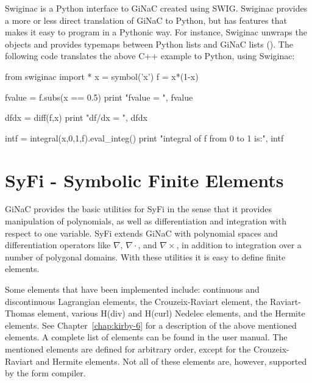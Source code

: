 Swiginac is a Python interface to GiNaC created using SWIG.  
Swiginac provides a more or less direct translation of GiNaC to Python, 
but has features that makes it easy to program in a Pythonic way. 
For instance, Swiginac unwraps the  objects and provides typemaps between Python lists and GiNaC
lists (). 
The following code translates the above C++ example to Python, using Swiginac:
\begin{python}
from swiginac import *
x = symbol('x')
f = x*(1-x) 

fvalue = f.subs(x == 0.5)
print "fvalue = ", fvalue 

dfdx = diff(f,x)
print "df/dx = ", dfdx 

intf = integral(x,0,1,f).eval_integ()
print "integral of f from 0 to 1 is:", intf 
\end{python}

\section{SyFi - Symbolic Finite Elements}

GiNaC provides the basic utilities for SyFi in the sense
that it provides manipulation of polynomials, as well as differentiation and integration  
with respect to one variable. SyFi extends GiNaC with polynomial spaces and 
differentiation operators like $\nabla$, $\nabla\cdot$, and $\nabla\times$, 
in addition to integration over a number of polygonal domains. 
With these utilities it is easy to define finite elements. 

Some elements that have been implemented include:
continuous and discontinuous Lagrangian elements, 
the Crouzeix-Raviart element, the Raviart-Thomas element, various H(div) and H(curl) Nedelec 
elements, and the Hermite elements. See Chapter~\ref{chap:kirby-6} for
a description of the above mentioned elements. 
A complete list of elements can be found
in the user manual. The mentioned elements are defined for arbitrary order, except for
the Crouzeix-Raviart and Hermite elements. Not all of these elements are, however, 
supported by the form compiler. 

